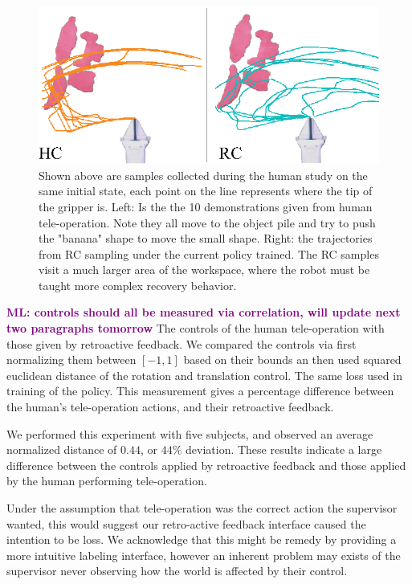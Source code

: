 \documentclass[10pt, conference]{ieeeconf}      %
\newcommand{\mlnote}[1]{\ifthenelse{ \boolean{include-notes}}%
 {\textcolor{purple}{\textbf{ML: #1}}}{}}
\begin{document}
\begin{figure}
\centering
\includegraphics{f_figs/traj_data.eps}
\caption{
    \footnotesize
Shown above are samples collected during the human study on the same initial state, each point on the line represents where the tip of the gripper is. Left: Is the the 10 demonstrations given from human tele-operation. Note they all move to the object pile and try to push the "banana" shape to move the small shape. Right: the trajectories  from RC sampling under the current policy trained. The RC samples visit a much larger area of the workspace, where the robot must be taught more complex recovery behavior. }

\label{fig:izzy_traj}
\end{figure}


\mlnote{controls should all be measured via correlation, will update next two paragraphs tomorrow}
The controls of the human tele-operation with those given by retroactive feedback. We compared the controls via first normalizing them between $[-1,1]$ based on their bounds an then used squared euclidean distance of the rotation and translation control. The same loss used in training of the policy. This measurement gives a  percentage difference between the human's tele-operation actions, and their retroactive feedback.


 We performed this experiment with five subjects, and observed an average normalized distance of $0.44$, or $44\%$ deviation. These results indicate a large  difference between the controls applied by retroactive feedback and those applied by the human performing tele-operation.
 
 Under the assumption that tele-operation was the correct action the supervisor wanted, this would suggest our retro-active feedback interface caused the intention to be loss. We acknowledge that this might be remedy by providing a more intuitive labeling interface, however an inherent problem may exists of the supervisor never observing how the world is affected by their control. 
\end{document}
